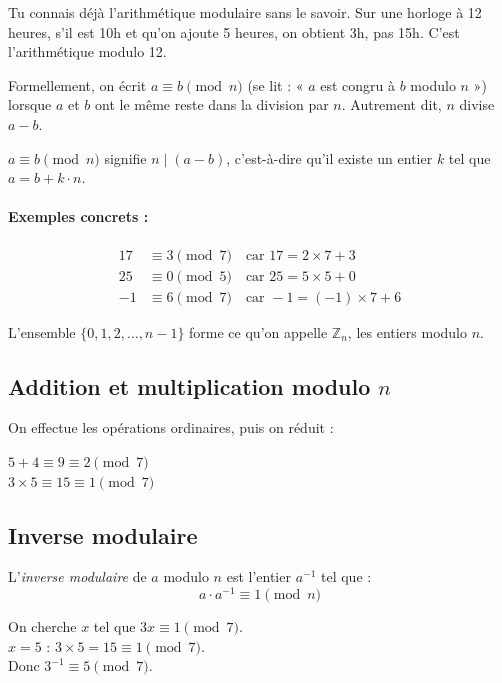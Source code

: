 \documentclass[11pt,a4paper]{article}
\begin{document}
Tu connais déjà l'arithmétique modulaire sans le savoir. Sur une horloge à 12 heures, s'il est 10h et qu'on ajoute 5 heures, on obtient 3h, pas 15h. C'est l'arithmétique modulo 12.

Formellement, on écrit $a \equiv b \pmod{n}$ (se lit : « $a$ est congru à $b$ modulo $n$ ») lorsque $a$ et $b$ ont le même reste dans la division par $n$. Autrement dit, $n$ divise $a - b$.

\begin{infobox}[Définition]
$a \equiv b \pmod{n}$ signifie $n \mid (a - b)$, c'est-à-dire qu'il existe un entier $k$ tel que $a = b + k \cdot n$.
\end{infobox}

\paragraph{Exemples concrets :}
\begin{align*}
17 &\equiv 3 \pmod{7} \quad \text{car } 17 = 2 \times 7 + 3 \\
25 &\equiv 0 \pmod{5} \quad \text{car } 25 = 5 \times 5 + 0 \\
-1 &\equiv 6 \pmod{7} \quad \text{car } -1 = (-1) \times 7 + 6
\end{align*}

L'ensemble $\{0, 1, 2, \ldots, n-1\}$ forme ce qu'on appelle $\mathbb{Z}_n$, les entiers modulo $n$.

\subsection{Addition et multiplication modulo $n$}

On effectue les opérations ordinaires, puis on réduit :

\begin{infobox}
$5 + 4 \equiv 9 \equiv 2 \pmod{7}$ \\
$3 \times 5 \equiv 15 \equiv 1 \pmod{7}$
\end{infobox}

\subsection{Inverse modulaire}

L'\emph{inverse modulaire} de $a$ modulo $n$ est l'entier $a^{-1}$ tel que :
\[a \cdot a^{-1} \equiv 1 \pmod{n}\]

\begin{resultbox}
On cherche $x$ tel que $3x \equiv 1 \pmod{7}$.\\
$x = 5$ : $3 \times 5 = 15 \equiv 1 \pmod{7}$. \checkmark \\
Donc $3^{-1} \equiv 5 \pmod{7}$.
\end{resultbox}
\end{document}
